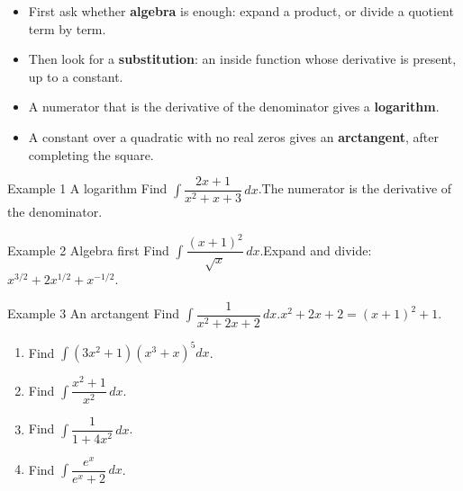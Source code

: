 \documentclass[11pt]{article}
\begin{document}

\begin{ideabox}
\begin{itemize}[leftmargin=*,itemsep=2pt,topsep=2pt]
  \item First ask whether \textbf{algebra} is enough: expand a product, or divide a quotient term by term.
  \item Then look for a \textbf{substitution}: an inside function whose derivative is present, up to a constant.
  \item A numerator that is the derivative of the denominator gives a \textbf{logarithm}.
  \item A constant over a quadratic with no real zeros gives an \textbf{arctangent}, after completing the square.
\end{itemize}
\end{ideabox}

\begin{example}{Example 1 \textperiodcentered{} A logarithm}
Find $\displaystyle\int\dfrac{2x+1}{x^2+x+3}\,dx$.\soln The numerator is the derivative of the denominator.
\end{example}

\begin{example}{Example 2 \textperiodcentered{} Algebra first}
Find $\displaystyle\int\dfrac{(x+1)^2}{\sqrt{x}}\,dx$.\soln Expand and divide: $x^{3/2}+2x^{1/2}+x^{-1/2}$.
\end{example}

\begin{example}{Example 3 \textperiodcentered{} An arctangent}
Find $\displaystyle\int\dfrac{1}{x^2+2x+2}\,dx$.\soln $x^2+2x+2=(x+1)^2+1$.
\end{example}

\newpage
{}

\begin{enumerate}[leftmargin=*,itemsep=2pt]
  \item Find $\displaystyle\int\left(3x^2+1\right)\left(x^3+x\right)^5dx$.\work{2.3cm}
  \item Find $\displaystyle\int\dfrac{x^2+1}{x^2}\,dx$.\work{2.3cm}
  \item Find $\displaystyle\int\dfrac{1}{1+4x^2}\,dx$.\work{2.3cm}
  \item Find $\displaystyle\int\dfrac{e^{x}}{e^{x}+2}\,dx$.\work{2.3cm}
\end{enumerate}
\end{document}
